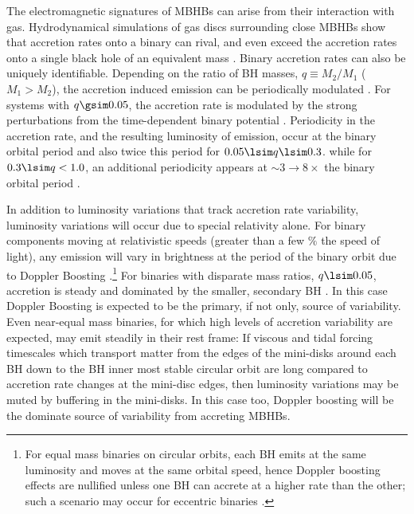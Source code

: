 The electromagnetic signatures of MBHBs can arise from their interaction with
gas. Hydrodynamical simulations of gas discs surrounding close MBHBs show that
accretion rates onto a binary can rival, and even exceed the accretion rates
onto a single black hole of an equivalent mass \citep{ShiKrolik:2012,
DHM:2013:MNRAS, Farris:2014, ShiKrolik:2015, MunozLai:2016}. Binary accretion
rates can also be uniquely identifiable. Depending on the ratio of BH masses,
$q \equiv M_2/M_1$ ($M_1>M_2$), the accretion induced emission can be
periodically modulated \citep{Farris:2015:Cool}. For systems with $q \gsim
0.05$, the accretion rate is modulated by the strong perturbations from the
time-dependent binary potential \citep{D'Orazio:CBDtrans:2016}. Periodicity in
the accretion rate, and the resulting luminosity of emission, occur at the
binary orbital period and also twice this period for $0.05 \lsim q \lsim 0.3$.
while for $0.3 \lsim q < 1.0$, an additional periodicity appears at $\sim3
\rightarrow 8\times$ the binary orbital period \citep{ShiKrolik:2012,
DHM:2013:MNRAS, Farris:2014, ShiKrolik:2015, MunozLai:2016}.

In addition to luminosity variations that track accretion rate variability,
luminosity variations will occur due to special relativity alone. For binary
components moving at relativistic speeds (greater than a few $\%$ the speed of
light), any emission will vary in brightness at the period of the binary orbit
due to Doppler Boosting \citep{PG1302MNRAS:2015a,
PG1302Nature:2015b}.\footnote{For equal mass binaries on circular orbits, each
BH emits at the same luminosity and moves at the same orbital speed, hence
Doppler boosting effects are nullified unless one BH can accrete at a higher
rate than the other; such a scenario may occur for eccentric binaries
\citep{MunozLai:2016}.}  For binaries with disparate mass ratios, $q \lsim
0.05$, accretion is steady and dominated by the smaller, secondary BH
\citep{DHM:2013:MNRAS, Farris:2014}. In this case Doppler Boosting is expected
to be the primary, if not only, source of variability. Even near-equal mass
binaries, for which high levels of accretion variability are expected, may
emit steadily in their rest frame: If viscous and tidal forcing timescales
which transport matter from the edges of the mini-disks around each BH down to
the BH inner most stable circular orbit are long compared to accretion rate
changes at the mini-disc edges, then luminosity variations may be muted by
buffering in the mini-disks. In this case too, Doppler boosting will be the
dominate source of variability from accreting MBHBs.



